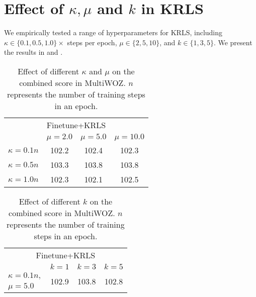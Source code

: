 \section{Effect of $\kappa,\mu$ and $k$ in KRLS}
\label{sec:Effect of kappa and mu in KRLS}
We empirically tested a range of hyperparameters for KRLS, including $\kappa \in \{0.1, 0.5, 1.0\} \times$ steps per epoch, $\mu \in \{2, 5, 10\}$, and $k \in \{1,3,5\}$. We present the results in  and .
\begin{table}[th]
  \centering
  \begin{tabular}{l c c c} 
     \toprule
     \multicolumn{4}{c}{Finetune+KRLS}\\
      & $\mu=2.0$ & $\mu=5.0$ & $\mu=10.0$\\
     \midrule
     $\kappa=0.1 n$   & 102.2 & 102.4 & 102.3 \\
     $\kappa=0.5 n$   & 103.3 & 103.8 & 103.8 \\
     $\kappa=1.0 n$   & 102.3 & 102.1 & 102.5 \\
     \bottomrule
  \end{tabular}
  \caption{Effect of different $\kappa$ and $\mu$ on the combined score in MultiWOZ. $n$ represents the number of training steps in an epoch.}
  \label{tbl:effect_of_kappa_and_mu}
\end{table}
\begin{table}[th]
  \centering
  \begin{tabular}{l c c c} 
      \toprule
     \multicolumn{4}{c}{Finetune+KRLS}\\
      & $k=1$ & $k=3$ & $k=5$\\
     \midrule
     $\kappa=0.1n,$ &\multirow{2}{*}{102.9} & \multirow{2}{*}{103.8} & \multirow{2}{*}{102.8} \\
     $\mu=5.0$ &  &  &  \\
     \bottomrule
  \end{tabular}
  \caption{Effect of different $k$ on the combined score in MultiWOZ. $n$ represents the number of training steps in an epoch.}
  \label{tbl:effect_of_k}
\end{table}

